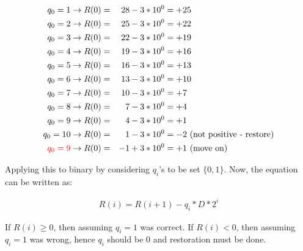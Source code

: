 \documentclass{article}
\begin{document}
\begin{align*}
    q_0 = 1                  & \rightarrow R(0) = & 28 - 3 * 10^0 & = +25                                 \\
    q_0 = 2                  & \rightarrow R(0) = & 25 - 3 * 10^0 & = +22                                 \\
    q_0 = 3                  & \rightarrow R(0) = & 22 - 3 * 10^0 & = +19                                 \\
    q_0 = 4                  & \rightarrow R(0) = & 19 - 3 * 10^0 & = +16                                 \\
    q_0 = 5                  & \rightarrow R(0) = & 16 - 3 * 10^0 & = +13                                 \\
    q_0 = 6                  & \rightarrow R(0) = & 13 - 3 * 10^0 & = +10                                 \\
    q_0 = 7                  & \rightarrow R(0) = & 10 - 3 * 10^0 & = +7                                  \\
    q_0 = 8                  & \rightarrow R(0) = & 7 - 3 * 10^0  & = +4                                  \\
    q_0 = 9                  & \rightarrow R(0) = & 4 - 3 * 10^0  & = +1                                  \\
    q_0 = 10                 & \rightarrow R(0) = & 1 - 3 * 10^0  & = -2 \text{ (not positive - restore)} \\
    \textcolor{red}{q_0 = 9} & \rightarrow R(0) = & -1 + 3 * 10^0 & = +1 \text{ (move on)}                \\
\end{align*}

Applying this to binary by considering $q_i$'s to be set $\{0, 1\}$.
Now, the equation can be written as:

\begin{align*}
    R(i) = R(i + 1) - q_i * D * 2^i
\end{align*}

If $R(i) \ge 0$, then assuming $q_i = 1$ was correct.
If $R(i) < 0$, then assuming $q_i = 1$ was wrong, hence $q_i$ should be 0 and restoration must be done.
\end{document}
